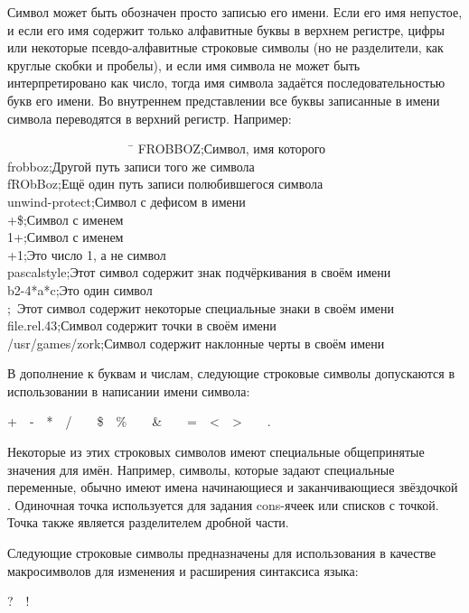 Символ может быть обозначен просто записью его имени.
Если его имя непустое, и если его имя содержит только алфавитные буквы в верхнем
регистре, цифры или некоторые псевдо-алфавитные строковые символы (но не
разделители, как круглые скобки и пробелы), и если имя символа не может быть
интерпретировано как число, тогда имя символа задаётся последовательностью букв
его имени.
Во внутреннем представлении все буквы записанные в имени символа переводятся в
верхний регистр.
Например:
\begin{lisp}
~~~~~~~~~~~~~~~~~~~~\=\kill
FROBBOZ\>;\textrm{Символ, имя которого } \\
frobboz\>;\textrm{Другой путь записи того же символа} \\
fRObBoz\>;\textrm{Ещё один путь записи полюбившегося символа} \\
unwind-protect\>;\textrm{Символ с дефисом в имени} \\
+\$\>;\textrm{Символ с именем \cd{+\$}} \\
1+\>;\textrm{Символ с именем } \\
+1\>;\textrm{Это число 1, а не символ} \\
pascal{\Xunderscore}style\>;\textrm{Этот символ содержит знак подчёркивания в своём
  имени} \\
b{\Xcircumflex}2-4*a*c\>;\textrm{Это один символ} \\
\>;~\textrm{Этот символ содержит некоторые специальные знаки в своём имени} \\
file.rel.43\>;\textrm{Символ содержит точки в своём имени} \\
/usr/games/zork\>;\textrm{Символ содержит наклонные черты в своём имени}
\end{lisp}

В дополнение к буквам и числам, следующие строковые символы допускаются в
использовании в написании имени символа:
\begin{lisp}
+~~-~~*~~/~~{\Xatsign}~~\$~~\%~~{\Xcircumflex}~~\&~~{\Xunderscore}~~=~~<~~>~~{\Xtilde}~~.
\end{lisp}

Некоторые из этих строковых символов имеют специальные общепринятые значения
для имён.
Например, символы, которые задают специальные переменные, обычно имеют имена
начинающиеся и заканчивающиеся звёздочкой \cd{*}.
Одиночная точка используется для задания cons-ячеек или списков с точкой. Точка
также является разделителем дробной части.

Следующие строковые символы предназначены для использования в качестве
макросимволов для изменения и расширения синтаксиса языка:
\begin{lisp}
?~~!~~{\Xlbracket}~~{\Xrbracket}~~{\Xlbrace}~~{\Xrbrace}
\end{lisp}

